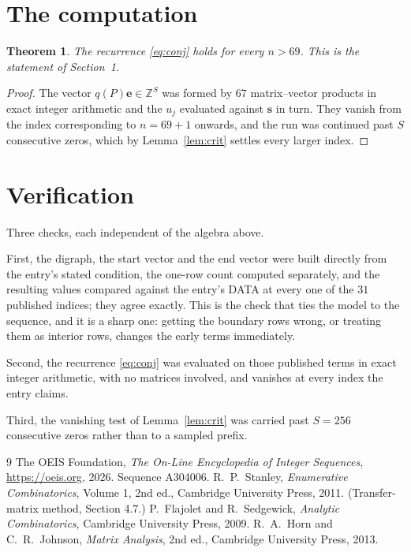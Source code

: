 \documentclass[11pt,a4paper]{article}
\theoremstyle{plain}
\newtheorem{theorem}{Theorem}
\theoremstyle{definition}
\begin{document}
\section{The computation}

\begin{theorem}
The recurrence \eqref{eq:conj} holds for every $n>69$. This is the statement of
Section~1.
\end{theorem}

\begin{proof}
The vector $q(P)\mathbf{e}\in\mathbb{Z}^{S}$ was formed by $67$ matrix--vector
products in exact integer arithmetic and the $u_j$ evaluated against $\mathbf{s}$ in turn.
They vanish from the index corresponding to $n=69+1$ onwards, and the run was continued
past $S$ consecutive zeros, which by Lemma~\ref{lem:crit} settles every larger index.
\end{proof}

\section{Verification}

Three checks, each independent of the algebra above.

First, the digraph, the start vector and the end vector were built directly from the
entry's stated condition, the one-row count computed separately, and the resulting values
compared against the entry's DATA at every one of the $31$ published indices; they
agree exactly. This is the check that ties the model to the sequence, and it is a sharp one:
getting the boundary rows wrong, or treating them as interior rows, changes the early terms
immediately.

Second, the recurrence \eqref{eq:conj} was evaluated on those published terms in exact
integer arithmetic, with no matrices involved, and vanishes at every index the entry claims.

Third, the vanishing test of Lemma~\ref{lem:crit} was carried past $S=256$ consecutive
zeros rather than to a sampled prefix.

\begin{thebibliography}{9}
 The OEIS Foundation, \emph{The On-Line Encyclopedia of Integer
Sequences}, \url{https://oeis.org}, 2026. Sequence A304006.
 R.~P.~Stanley, \emph{Enumerative Combinatorics}, Volume 1, 2nd ed.,
Cambridge University Press, 2011. (Transfer-matrix method, Section 4.7.)
 P.~Flajolet and R.~Sedgewick, \emph{Analytic Combinatorics}, Cambridge
University Press, 2009.
 R.~A.~Horn and C.~R.~Johnson, \emph{Matrix Analysis}, 2nd ed., Cambridge
University Press, 2013.
\end{thebibliography}
\end{document}
